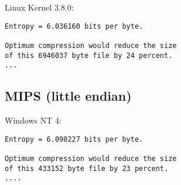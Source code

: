 Linux Kernel 3.8.0:

\begin{lstlisting}
Entropy = 6.036160 bits per byte.

Optimum compression would reduce the size
of this 6946037 byte file by 24 percent.
...
\end{lstlisting}

\subsection{MIPS (little endian)}

   Windows NT 4:

\begin{lstlisting}
Entropy = 6.098227 bits per byte.

Optimum compression would reduce the size
of this 433152 byte file by 23 percent.
....
\end{lstlisting}


